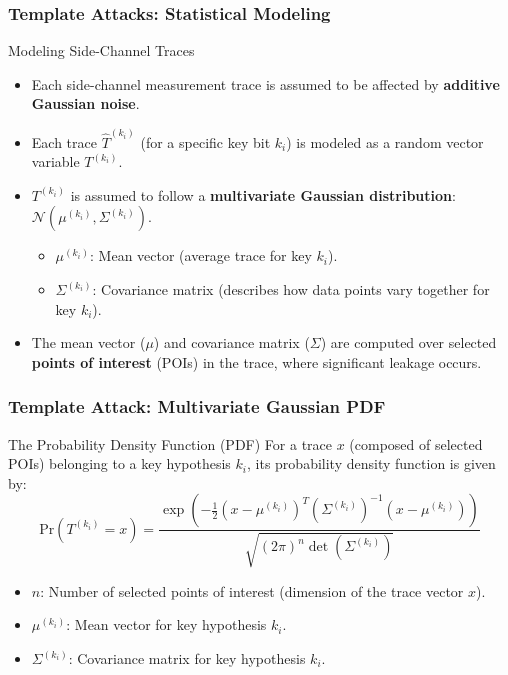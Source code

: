 \begin{frame}
    \frametitle{Template Attacks: Statistical Modeling} 
    \begin{block}{Modeling Side-Channel Traces}
        \begin{itemize}
            \item Each side-channel measurement trace is assumed to be affected by \textbf{additive Gaussian noise}.
            \item Each trace $\hat{T}^{(k_i)}$ (for a specific key bit $k_i$) is modeled as a random vector variable $T^{(k_i)}$.
            \item $T^{(k_i)}$ is assumed to follow a \textbf{multivariate Gaussian distribution}: $\mathcal{N}(\mu^{(k_i)}, \Sigma^{(k_i)})$.
                \begin{itemize}
                    \item $\mu^{(k_i)}$: Mean vector (average trace for key $k_i$).
                    \item $\Sigma^{(k_i)}$: Covariance matrix (describes how data points vary together for key $k_i$).
                \end{itemize}
            \item The mean vector ($\mu$) and covariance matrix ($\Sigma$) are computed over selected \textbf{points of interest} (POIs) in the trace, where significant leakage occurs.
        \end{itemize}
    \end{block}
\end{frame}



\begin{frame}
    \frametitle{Template Attack: Multivariate Gaussian PDF}
    \begin{block}{The Probability Density Function (PDF)}
        For a trace $x$ (composed of selected POIs) belonging to a key hypothesis $k_i$, its probability density function is given by:
        $$
        \text{Pr}(T^{(k_i)}=x) = \frac{\exp\left(-\frac{1}{2}(x-\mu^{(k_i)})^T(\Sigma^{(k_i)})^{-1}(x-\mu^{(k_i)})\right)}{\sqrt{(2\pi)^n \det(\Sigma^{(k_i)})}}
        $$
        \begin{itemize}
            \item $n$: Number of selected points of interest (dimension of the trace vector $x$).
            \item $\mu^{(k_i)}$: Mean vector for key hypothesis $k_i$.
            \item $\Sigma^{(k_i)}$: Covariance matrix for key hypothesis $k_i$.
        \end{itemize}
    \end{block}
\end{frame}




